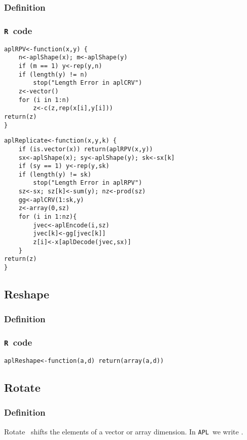\documentclass[11pt]{amsart}
\theoremstyle{plain}
\theoremstyle{definition}
\theoremstyle{remark}
\newcommand{\tR}{\texttt{R}}
\newcommand{\tA}{\texttt{APL}}
\newcommand{\tAc}[1]{{\apl{#1}}}
\begin{document}
\subsubsection{Definition}
\subsubsection{\tR\ code}\quad
\begin{lstlisting}
aplRPV<-function(x,y) {
    n<-aplShape(x); m<-aplShape(y)
    if (m == 1) y<-rep(y,n)
    if (length(y) != n)
        stop("Length Error in aplCRV")
    z<-vector()
    for (i in 1:n)
        z<-c(z,rep(x[i],y[i]))
return(z)
}
\end{lstlisting}
\begin{lstlisting}
aplReplicate<-function(x,y,k) {
    if (is.vector(x)) return(aplRPV(x,y))
    sx<-aplShape(x); sy<-aplShape(y); sk<-sx[k]
    if (sy == 1) y<-rep(y,sk)
    if (length(y) != sk)
        stop("Length Error in aplRPV")
    sz<-sx; sz[k]<-sum(y); nz<-prod(sz)
    gg<-aplCRV(1:sk,y)
    z<-array(0,sz)
    for (i in 1:nz){
        jvec<-aplEncode(i,sz)
        jvec[k]<-gg[jvec[k]]
        z[i]<-x[aplDecode(jvec,sx)]
    }
return(z)
}
\end{lstlisting}


\subsection{Reshape}\quad
\subsubsection{Definition}
\subsubsection{\tR\ code}\quad
\begin{lstlisting}
aplReshape<-function(a,d) return(array(a,d))
\end{lstlisting}

\subsection{Rotate}
\subsubsection{Definition}
Rotate~\citep[p. 191--193]{helzer_89} shifts the elements of a vector or array dimension. In \tA\ we write
\tAc{A\qrotate B}.
\end{document}
